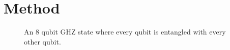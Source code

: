 \section{Method}
\lipsum[16]

\begin{figure}[htb]
  \centering
  
  \caption{An 8 qubit GHZ state where every qubit is entangled with every other qubit.\label{fig:ghz}}
\end{figure}

\lipsum[3]
